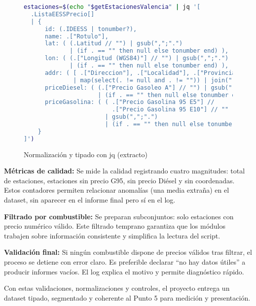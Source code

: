 \begin{figure}[H]
  \footnotesize
  \begin{lstlisting}[language=bash]
estaciones=$(echo "$getEstacionesValencia" | jq '[
  .ListaEESSPrecio[]
  | {
      id: (.IDEESS | tonumber?),
      name: .["Rotulo"],
      lat: ( (.Latitud // "") | gsub(",";".") 
             | (if . == "" then null else tonumber end) ),
      lon: ( (.["Longitud (WGS84)"] // "") | gsub(",";".") 
             | (if . == "" then null else tonumber end) ),
      addr: ( [ .["Direccion"], .["Localidad"], .["Provincia"] ] 
              | map(select(. != null and . != "")) | join(", ") ),
      priceDiesel: ( (.["Precio Gasoleo A"] // "") | gsub(",";".") 
                     | (if . == "" then null else tonumber end) ),
      priceGasolina: ( ( .["Precio Gasolina 95 E5"] // 
                         .["Precio Gasolina 95 E10"] // "" )
                       | gsub(",";".") 
                       | (if . == "" then null else tonumber end) )
    }
]')
\end{lstlisting}
  \caption{Normalización y tipado con jq (extracto)}
\end{figure}

\textbf{Métricas de calidad:} Se mide la calidad registrando cuatro magnitudes: total de estaciones, estaciones sin precio G95, sin precio Diésel y sin coordenadas. Estos contadores permiten relacionar anomalías (una media extraña) en el dataset, sin aparecer en el informe final pero sí en el log.

\textbf{Filtrado por combustible:} Se preparan subconjuntos: solo estaciones con precio numérico válido. Este filtrado temprano garantiza que los módulos trabajen sobre información consistente y simplifica la lectura del script.

\textbf{Validación final:} Si ningún combustible dispone de precios válidos tras filtrar, el proceso se detiene con error claro. Es preferible declarar ``no hay datos útiles'' a producir informes vacíos. El log explica el motivo y permite diagnóstico rápido.

Con estas validaciones, normalizaciones y controles, el proyecto entrega un dataset tipado, segmentado y coherente al Punto 5 para medición y presentación.

